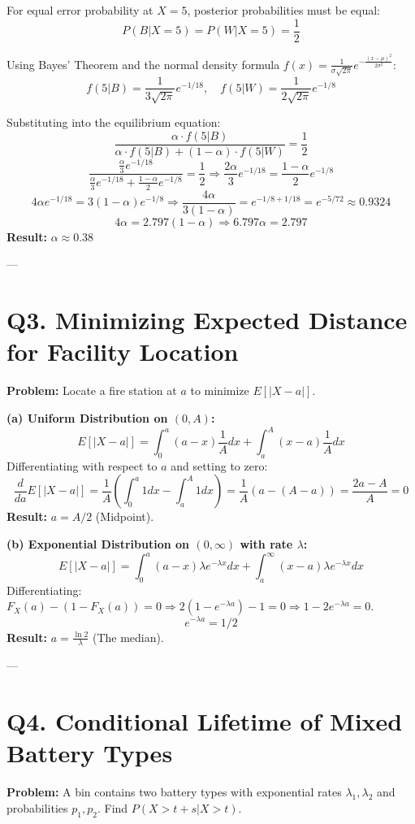 \documentclass{article}
\begin{document}
For equal error probability at $X=5$, posterior probabilities must be equal:
\[ P(B|X=5) = P(W|X=5) = \frac{1}{2} \]

Using Bayes' Theorem and the normal density formula $f(x) = \frac{1}{\sigma\sqrt{2\pi}}e^{-\frac{(x-\mu)^2}{2\sigma^2}}$:
\[ f(5|B) = \frac{1}{3\sqrt{2\pi}}e^{-1/18}, \quad f(5|W) = \frac{1}{2\sqrt{2\pi}}e^{-1/8} \]

Substituting into the equilibrium equation:
\[ \frac{\alpha \cdot f(5|B)}{\alpha \cdot f(5|B) + (1-\alpha) \cdot f(5|W)} = \frac{1}{2} \]
\[ \frac{\frac{\alpha}{3} e^{-1/18}}{\frac{\alpha}{3} e^{-1/18} + \frac{1-\alpha}{2} e^{-1/8}} = \frac{1}{2} \Rightarrow \frac{2\alpha}{3} e^{-1/18} = \frac{1-\alpha}{2} e^{-1/8} \]
\[ 4\alpha e^{-1/18} = 3(1-\alpha)e^{-1/8} \Rightarrow \frac{4\alpha}{3(1-\alpha)} = e^{-1/8 + 1/18} = e^{-5/72} \approx 0.9324 \]
\[ 4\alpha = 2.797(1-\alpha) \Rightarrow 6.797\alpha = 2.797 \]
\textbf{Result:} $\alpha \approx 0.38$

---

\section*{Q3. Minimizing Expected Distance for Facility Location}
\textbf{Problem:} Locate a fire station at $a$ to minimize $E[|X-a|]$.

\textbf{(a) Uniform Distribution on $(0, A)$:}
\[ E[|X-a|] = \int_{0}^{a}(a-x)\frac{1}{A}dx + \int_{a}^{A}(x-a)\frac{1}{A}dx \]
Differentiating with respect to $a$ and setting to zero: 
\[ \frac{d}{da} E[|X-a|] = \frac{1}{A} \left( \int_0^a 1 dx - \int_a^A 1 dx \right) = \frac{1}{A}(a - (A - a)) = \frac{2a - A}{A} = 0 \]
\textbf{Result:} $a = A/2$ (Midpoint).

\textbf{(b) Exponential Distribution on $(0, \infty)$ with rate $\lambda$:}
\[ E[|X-a|] = \int_{0}^{a}(a-x)\lambda e^{-\lambda x}dx + \int_{a}^{\infty}(x-a)\lambda e^{-\lambda x}dx \]
Differentiating: $F_X(a) - (1 - F_X(a)) = 0 \Rightarrow 2(1 - e^{-\lambda a}) - 1 = 0 \Rightarrow 1 - 2e^{-\lambda a} = 0$.
\[ e^{-\lambda a} = 1/2 \]
\textbf{Result:} $a = \frac{\ln 2}{\lambda}$ (The median).

---

\section*{Q4. Conditional Lifetime of Mixed Battery Types}
\textbf{Problem:} A bin contains two battery types with exponential rates $\lambda_1, \lambda_2$ and probabilities $p_1, p_2$. Find $P(X > t+s | X > t)$.
\end{document}
